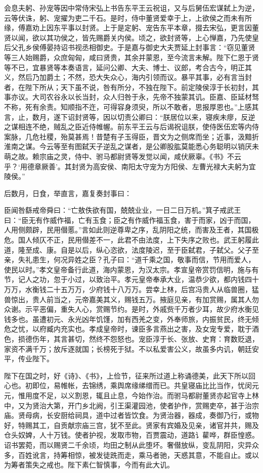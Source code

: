 \documentclass[]{article}
\begin{document}
会息夫躬、孙宠等因中常侍宋弘上书告东平王云祝诅，又与后舅伍宏谋弑上为逆，云等伏诛，躬、宠擢为吏二千石。是时，侍中董贤爱幸于上，上欲侯之而未有所缘，傅嘉劝上因东平事以封贤。上于是定躬、宠告东平本章，掇去宋弘，更言因董贤以闻，欲以其功侯之，皆先赐爵关内侯。顷之，欲封贤等，上心惮嘉，乃先使皇后父孔乡侯傅晏持诏书视丞相御史。于是嘉与御史大夫贾延上封事言：``窃见董贤等三人始赐爵，众庶匈匈，咸曰贤贵，其余并蒙恩，至今流言未解。陛下仁恩于贤等不已，宜暴贤等本奏语言，延问公卿、大夫、博士、议郎，考合古今，明正其义，然后乃加爵土；不然，恐大失众心，海内引领而议。暴平其事，必有言当封者，在陛下所从；天下虽不说，咎有所分，不独在陛下。前定陵侯淳于长初封，其事亦议。大司农谷永以长当封，众人归咎于永，先帝不独蒙其讥。臣嘉、臣延材驽不称，死有余责。知顺指不迕，可得容身须臾，所以不敢者，思报厚恩也。''上感其言，止，数月，遂下诏封贤等，因以切责公卿曰：``朕居位以来，寝疾未瘳，反逆之谋相连不绝，贼乱之臣近侍帷幄。前东平王云与后谒祝诅朕，使侍医伍宏等内侍案脉，几危社稷，殆莫甚焉！昔楚有子玉得臣，晋文为之侧席而坐；近事，汲黯折淮南之谋。今云等至有图弑天子逆乱之谋者，是公卿股肱莫能悉心务聪明以销厌未萌之故。赖宗庙之灵，侍中、驸马都尉贤等发觉以闻，咸伏厥辜。《书》不云乎？`用德章厥善'。其封贤为高安侯、南阳太守宠为方阳侯、左曹光禄大夫躬为宜陵侯。''

后数月，日食，举直言，嘉复奏封事曰：

臣闻咎繇戒帝舜曰：``亡敖佚欲有国，兢兢业业，一日二日万机。''箕子戒武王曰：``臣无有作威作福，亡有玉食；臣之有作威作福玉食，害于而家，凶于而国，人用侧颇辟，民用僣慝。''言如此则逆尊卑之序，乱阴阳之统，而害及王者，其国极危。国人倾仄不正，民用僣差不一，此君不由法度，上下失序之败也。武王躬履此道，隆至成、康。自是以后，纵心恣欲，法度陵迟，至于臣弑君，子弑父。父子至亲，失礼患生，何况异姓之臣？孔子曰：``道千乘之国，敬事而信，节用而爱人，使民以时。''孝文皇帝备行此道，海内蒙恩，为汉太宗。孝宣皇帝赏罚信明，施与有节，记人之功，忽于小过，以致治平。孝元皇帝奉承大业，温恭少欲，都内钱四十万万，水衡钱二十五万万，少府钱十八万万。尝幸上林，后宫冯贵人从临兽圈，猛兽惊出，贵人前当之，元帝嘉美其义，赐钱五万。掖庭见亲，有加赏赐，属其人勿众谢。示平恶偏，重失人心，赏赐节约。是时，外戚赀千万者少耳，故少府水衡见钱多也。虽遭初元、永光凶年饥馑，加有西羌之变，外奉师旅，内振贫民，终无倾危之忧，以府臧内充实也。孝成皇帝时，谏臣多言燕出之害，及女宠专爱，耽于酒色，损德伤年，其言甚切，然终不怨怒也。宠臣淳于长、张放、史育：育数贬退，家资不满千万；放斥逐就国；长榜死于狱。不以私爱害公义，故虽多内讥，朝廷安平，传业陛下。

陛下在国之时，好《诗》、《书》，上俭节，征来所过道上称诵德美，此天下所以回心也。初即位，易帷帐，去锦绣，乘舆席缘绨缯而已。共皇寝庙比比当作，忧闵元元，惟用度不足，以义割恩，辄且止息，今始作治。而驸马都尉董贤亦起官寺上林中，又为贤治大第，开门乡北阙，引王渠灌园池，使者护作，赏赐吏卒，甚于治宗庙。贤母病，长安厨给祠具，道中过者皆饮食。为贤治器，器成，奏御乃行，或物好，特赐其工，自贡献宗庙三宫，犹不至此。贤家有宾婚及见亲，诸官并共，赐及仓头奴婢，人十万钱。使者护视，发取市物，百贾震动，道路讠雚哗，群臣惶惑。诏书罢菀，而以赐贤二千余顷，均田之制从此堕坏。奢僣放纵，变乱阴阳，灾异众多，百姓讹言，持筹相惊，被发徒跣而走，乘马者驰，天惑其意，不能自止。或以为筹者策失之戒也。陛下素仁智慎事，今而有此大讥。
\end{document}
